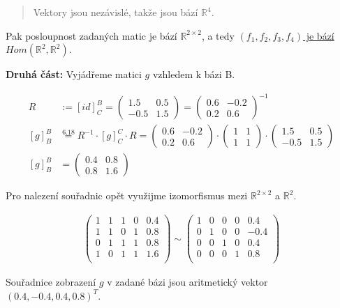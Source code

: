 \documentclass[12pt]{article}
\begin{document}
\begin{enumerate}
\begin{quote}
      Vektory jsou nezávislé, takže jsou bází $\mathbb{R}^4$.

    \end{quote}

    Pak posloupnost zadaných matic je bází $\mathbb{R}^{2\times2}$, a tedy \underline{$(f_1,f_2,f_3,f_4)$ je bází $Hom(\mathbb{R}^2,\mathbb{R}^2)$}.

    \textbf{Druhá část:} Vyjádřeme matici $g$ vzhledem k bázi B.

    \begin{align*}
      R &:= [id]^B_C = \left(\begin{array}{cc}
        1.5 & 0.5 \\ -0.5 & 1.5
      \end{array}\right) = \left(\begin{array}{cc}
        0.6 & -0.2 \\ 0.2 & 0.6
      \end{array}\right)^{-1} \\
      [g]^B_B &\overset{6.18}{=} R^{-1} \cdot [g]^C_C \cdot R = \left(\begin{array}{cc}
        0.6 & -0.2 \\ 0.2 & 0.6
      \end{array}\right) \cdot \left(\begin{array}{cc}
        1&1 \\ 1&1       
      \end{array}\right) \cdot \left(\begin{array}{cc}
        1.5 & 0.5 \\ -0.5 & 1.5
      \end{array}\right) \\
      [g]^B_B &= \left(\begin{array}{cc}
        0.4 & 0.8 \\ 0.8 & 1.6
      \end{array}\right)
    \end{align*}

    Pro nalezení souřadnic opět využijme izomorfismus mezi $\mathbb{R}^{2\times2}$ a $\mathbb{R}^2$.

    \begin{align*}
      \left(\begin{array}{cccc|c}
          1&1&1&0 & 0.4\\
          1&1&0&1 & 0.8\\
          0&1&1&1 & 0.8\\
          1&0&1&1 & 1.6\\
      \end{array}\right)
      \sim
      \left(\begin{array}{cccc|c}
          1&0&0&0&0.4 \\
          0&1&0&0&-0.4 \\
          0&0&1&0&0.4 \\
          0&0&0&1&0.8 \\
      \end{array}\right)
    \end{align*}

    Souřadnice zobrazení $g$ v zadané bázi jsou aritmetický vektor \underline{\underline{$(0.4, -0.4, 0.4, 0.8)^T$}}.
\end{enumerate}
\end{document}

